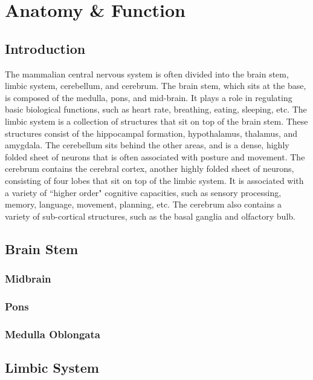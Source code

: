 \chapter{Anatomy \& Function}
\label{chap: anatomy}

\section{Introduction}

The mammalian central nervous system is often divided into the brain stem, limbic system, cerebellum, and cerebrum. The brain stem, which sits at the base, is composed of the medulla, pons, and mid-brain. It plays a role in regulating basic biological functions, such as heart rate, breathing, eating, sleeping, etc. The limbic system is a collection of structures that sit on top of the brain stem. These structures consist of the hippocampal formation, hypothalamus, thalamus, and amygdala. The cerebellum sits behind the other areas, and is a dense, highly folded sheet of neurons that is often associated with posture and movement. The cerebrum contains the cerebral cortex, another highly folded sheet of neurons, consisting of four lobes that sit on top of the limbic system. It is associated with a variety of ``higher order" cognitive capacities, such as sensory processing, memory, language, movement, planning, etc. The cerebrum also contains a variety of sub-cortical structures, such as the basal ganglia and olfactory bulb.


\section{Brain Stem}

\subsection{Midbrain}

\subsection{Pons}

\subsection{Medulla Oblongata}


\section{Limbic System}


